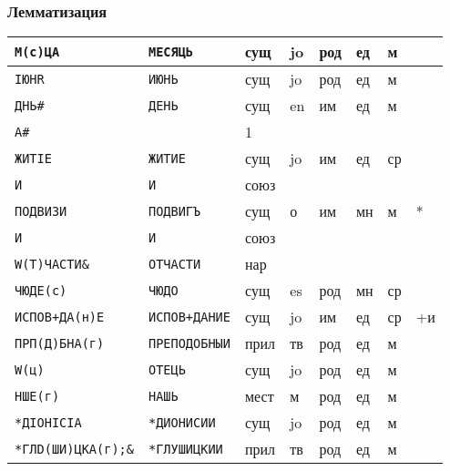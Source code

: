 \begin{frame}
  \frametitle{Лемматизация}

  \footnotesize \setlength{\aboverulesep}{0.5pt} \setlength{\belowrulesep}{0.5pt}
  \begin{tabularx}{\textwidth}{XXp{0.75cm}p{0.75cm}p{0.75cm}p{0.75cm}p{0.75cm}p{0.75cm}}
    \toprule
    \texttt{М(с)ЦА} & \texttt{МЕСЯЦЬ}                & сущ  & jo & род & ед & м  &    \\ \midrule
    \texttt{IЮНR} & \texttt{ИЮНЬ}                    & сущ  & jo & род & ед & м  &    \\ \midrule
    \texttt{ДНЬ\#} & \texttt{ДЕНЬ}                   & сущ  & en & им  & ед & м  &    \\ \midrule
    \texttt{А\#} &                                   & 1    &    &     &    &    &    \\ \midrule
    \texttt{ЖИТIЕ} & \texttt{ЖИТИЕ}                  & сущ  & jo & им  & ед & ср &    \\ \midrule
    \texttt{И} & \texttt{И}                          & союз &    &     &    &    &    \\ \midrule
    \texttt{ПОДВИЗИ} & \texttt{ПОДВИГЪ}              & сущ  & о  & им  & мн & м  & *  \\ \midrule
    \texttt{И} & \texttt{И}                          & союз &    &     &    &    &    \\ \midrule
    \texttt{W(Т)ЧАСТИ\&} & \texttt{ОТЧАСТИ}          & нар  &    &     &    &    &    \\ \midrule
    \texttt{ЧЮДЕ(с)} & \texttt{ЧЮДО}                 & сущ  & es & род & мн & ср &    \\ \midrule
    \texttt{ИСПОВ+ДА(н)Е} & \texttt{ИСПОВ+ДАНИЕ}     & сущ  & jo & им  & ед & ср & +и \\ \midrule
    \texttt{ПРП(Д)БНА(г)} & \texttt{ПРЕПОДОБНЫИ}     & прил & тв & род & ед & м  &    \\ \midrule
    \texttt{W(ц)} & \texttt{ОТЕЦЬ}                   & сущ  & jo & род & ед & м  &    \\ \midrule
    \texttt{НШЕ(г)} & \texttt{НАШЬ}                  & мест & м  & род & ед & м  &    \\ \midrule
    \texttt{*ДIОНIСIА} & \texttt{*ДИОНИСИИ}          & сущ  & jo & род & ед & м  &    \\ \midrule
    \texttt{*ГЛD(ШИ)ЦКА(г);\&} & \texttt{*ГЛУШИЦКИИ} & прил & тв & род & ед & м  &    \\ \bottomrule
  \end{tabularx}
\end{frame}

